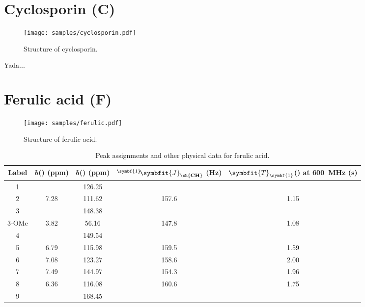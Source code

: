 \clearpage

\section{Cyclosporin (C)}

\begin{figure}[!ht]
    \centering
    \texttt{[image: samples/cyclosporin.pdf]}%
    \caption[Structure of cyclosporin]{
        Structure of cyclosporin.
    }
    \label{fig:samples_cyclosporin}
\end{figure}

Yada...

\clearpage

\section{Ferulic acid (F)}

\begin{figure}[!ht]
    \centering
    \texttt{[image: samples/ferulic.pdf]}%
    \caption[Structure of ferulic acid]{
        Structure of ferulic acid.
    }
    \label{fig:samples_ferulic}
\end{figure}

\begin{table}[!ht] \begin{tabular}{cSSSS}
        \toprule
        \textbf{Label} & {$\symbf{\delta}$\textbf{(\proton{}) (ppm)}} & {$\symbf{\delta}$\textbf{(\carbon{}) (ppm)}} & {${}^{\symbf{1}}\!\symbfit{J}_{\textbf{\ch{CH}}}$ \textbf{(Hz)}} & {$\symbfit{T}_{\symbf{1}}$\textbf{(\proton{}) at \qty{600}{MHz} (s)}} \\
             &      & 126.25 &       &      \\
        2     & 7.28 & 111.62 & 157.6 & 1.15 \\
        3     &      & 148.38 &       &      \\
        3-OMe & 3.82 & 56.16  & 147.8 & 1.08 \\
        4     &      & 149.54 &       &      \\
        5     & 6.79 & 115.98 & 159.5 & 1.59 \\
        6     & 7.08 & 123.27 & 158.6 & 2.00 \\
        7     & 7.49 & 144.97 & 154.3 & 1.96 \\
        8     & 6.36 & 116.08 & 160.6 & 1.75 \\
        9     &      & 168.45 &       &      \\
        \bottomrule
    \end{tabular}
    \caption[Peak assignments for ferulic acid]{
        Peak assignments and other physical data for ferulic acid.
    }
    \label{tbl:ferulic_assignments}
\end{table}

